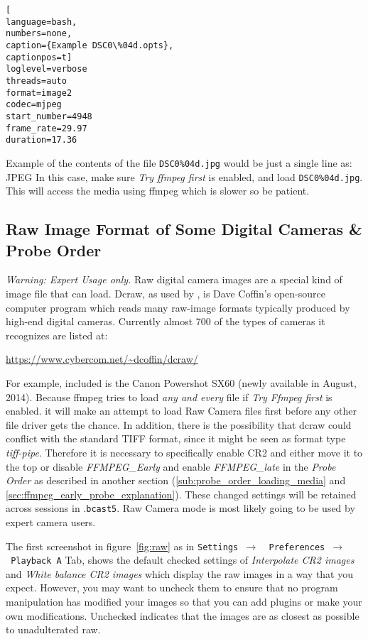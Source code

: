 \begin{lstlisting}[
language=bash,
numbers=none,
caption={Example DSC0\%04d.opts},
captionpos=t]
loglevel=verbose
threads=auto
format=image2
codec=mjpeg 
start_number=4948
frame_rate=29.97
duration=17.36
\end{lstlisting}

Example of the contents of the file \texttt{DSC0\%04d.jpg} would be just a single line as:  JPEG
In this case, make sure \textit{Try ffmpeg first} is enabled, and load \texttt{DSC0\%04d.jpg}.  
This will access the media using ffmpeg which is slower so be patient.

\subsection{Raw Image Format of Some Digital Cameras \& Probe Order}%
\label{sub:raw_image_format_digital_camera_probe_order}

\textit{Warning: Expert Usage only.}  Raw digital camera images are a special kind of image file that \CGG{} can load. Dcraw, as used by \CGG{}, is Dave Coffin’s open-source computer program which reads many raw-image formats typically produced by high-end digital cameras.  Currently almost 700 of the types of cameras it recognizes are listed at:

\hspace{4em}	{\small \url{https://www.cybercom.net/~dcoffin/dcraw/}}

For example, included is the Canon Powershot SX60 (newly available in August, 2014).  Because ffmpeg tries to load \textit{any and every} file if \textit{Try Ffmpeg first} is enabled. it will make an attempt to load Raw Camera files first before any other file driver gets the chance.  In addition, there is the possibility that dcraw could conflict with the standard TIFF format, since it might be seen as format type \textit{tiff-pipe}.  Therefore it is necessary to specifically enable CR2 and either move it to the top or disable \textit{FFMPEG\_Early} and enable \textit{FFMPEG\_late} in the \textit{Probe Order} as described in another section (\ref{sub:probe_order_loading_media} and \ref{sec:ffmpeg_early_probe_explanation}).  These changed settings will be retained across \CGG{} sessions in .\texttt{bcast5}.  Raw Camera mode is most likely going to be used by expert camera users.

The first screenshot in figure~\ref{fig:raw} as in \texttt{Settings $\rightarrow$ ~Preferences $\rightarrow$ ~Playback A} Tab, shows the default checked settings of \textit{Interpolate CR2 images} and \textit{White balance CR2 images} which display the raw images in a way that you expect.  However, you may want to uncheck them to ensure that no program manipulation has modified your images so that you can add plugins or make your own modifications.  Unchecked indicates that the images are as closest as possible to unadulterated raw.

